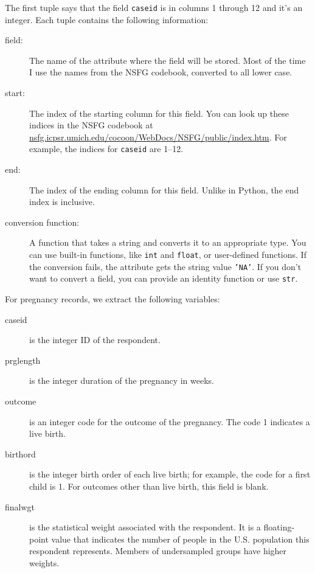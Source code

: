 \documentclass[12pt]{book}
\begin{document}
The first tuple says that the field {\tt caseid} is in columns
1 through 12 and it's an integer.  Each tuple contains the following
information:

\begin{description}

\item[field:] The name of the attribute where the field
will be stored.  Most of the time I use the names from the
NSFG codebook, converted to all lower case.

\item[start:] The index of the starting column for this
field.  You can look up these indices in the NSFG codebook
at \url{nsfg.icpsr.umich.edu/cocoon/WebDocs/NSFG/public/index.htm}.
For example, the indices for {\tt caseid} are
1--12.

\item[end:] The index of the ending column for this
field.  Unlike in Python, the end index is inclusive.

\item[conversion function:] A function that takes a string
and converts it to an appropriate type.  You can use built-in
functions, like {\tt int} and {\tt float}, or user-defined
functions.  If the conversion fails, the attribute gets the
string value {\tt 'NA'}.  If you don't want to convert a
field, you can provide an identity function or use {\tt str}.

\end{description}

For pregnancy records, we extract the following variables:

\begin{description}

\item[caseid] is the integer ID of the respondent.

\item[prglength] is the integer duration of the pregnancy in weeks.

\item[outcome] is an integer code for the outcome of the pregnancy.
The code 1 indicates a live birth.

\item[birthord] is the integer birth order of each live birth;
for example, the code for a first child is 1. 
For outcomes other than live birth, this field is blank.

\item[finalwgt] is the statistical weight associated with the respondent.
It is a floating-point value that indicates the number of people in
the U.S. population this respondent represents.  Members of undersampled
groups have higher weights.

\end{description}
\end{document}
